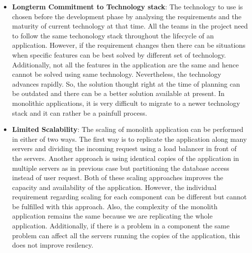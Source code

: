 \begin{itemize}[leftmargin=.5in]
\\
\item \textbf{Longterm Commitment to Technology stack}: The technology to use is chosen before the development phase by analysing the requirements and the maturity of current technology at that time. All the teams in the project need to follow the same techonology stack throughout the lifecycle of an application. However, if the requirement changes then there can be situations when specific features can be best solved by different set of technology. Additionally, not all the features in the application are the same and hence cannot be solved using same technology. Nevertheless, the technology advances rapidly. So, the solution thought right at the time of planning can be outdated and there can be a better solution available at present. In monolithic applications, it is very difficult to migrate to a newer technology stack and it can rather be a painfull process.
\\
\item \textbf{Limited Scalability}: The scaling of monolith application can be performed in either of two ways. The first way is to replicate the application along many servers and dividing the incoming request using a load balancer in front of the servers. Another approach is using identical copies of the application in multiple servers as in previous case but partitioning the database access instead of user request. Both of these scaling approaches improves the capacity and availability of the application. However, the individual requirement regarding scaling for each component can be different but cannot be fulfilled with this approach. Also, the complexity of the monolith application remains the same because we are replicating the whole application. Additionally, if there is a problem in a component the same problem can affect all the servers running the copies of the application, this does not improve resilency.\cite{MacVittie:2014aa}\cite{Namiot:2014aa}
\end{itemize}
\\


